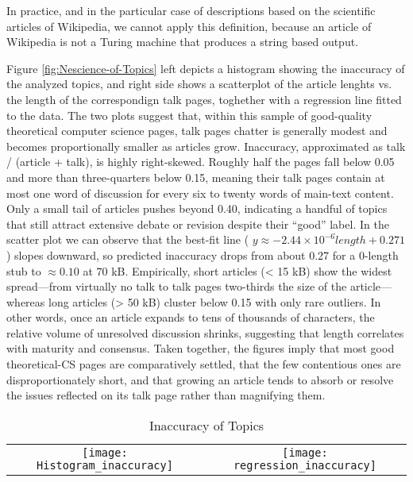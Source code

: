 In practice, and in the particular case of descriptions based on the scientific articles of Wikipedia, we cannot apply this definition, because an article of Wikipedia is not a Turing machine that produces a string based output.

Figure \ref{fig:Nescience-of-Topics} left depicts a histogram showing the inaccuracy of the analyzed topics, and right side shows a scatterplot of the article lenghts vs. the length of the correspondign talk pages, toghether with a regression line fitted to the data. The two plots suggest that, within this sample of good-quality theoretical computer science pages, talk pages chatter is generally modest and becomes proportionally smaller as articles grow. Inaccuracy, approximated as talk / (article + talk), is highly right-skewed.  Roughly half the pages fall below 0.05 and more than three-quarters below 0.15, meaning their talk pages contain at most one word of discussion for every six to twenty words of main-text content.  Only a small tail of articles pushes beyond 0.40, indicating a handful of topics that still attract extensive debate or revision despite their “good” label. In the scatter plot we can observe that the best-fit line ( $y \approx -2.44 \times 10^{-6} \dot length + 0.271$ ) slopes downward, so predicted inaccuracy drops from about 0.27 for a 0-length stub to $\approx 0.10$ at 70 kB.  Empirically, short articles (< 15 kB) show the widest spread—from virtually no talk to talk pages two-thirds the size of the article—whereas long articles (> 50 kB) cluster below 0.15 with only rare outliers.  In other words, once an article expands to tens of thousands of characters, the relative volume of unresolved discussion shrinks, suggesting that length correlates with maturity and consensus. Taken together, the figures imply that most good theoretical-CS pages are comparatively settled, that the few contentious ones are disproportionately short, and that growing an article tends to absorb or resolve the issues reflected on its talk page rather than magnifying them.

\begin{table}
\begin{centering}
\begin{tabular}{c c}
\texttt{[image: Histogram\_inaccuracy]}
&
\texttt{[image: regression\_inaccuracy]}\tabularnewline
\end{tabular}
\par\end{centering}
\caption{\label{fig:Inaccuracy-of-Topics}Inaccuracy of Topics}
\end{table}

